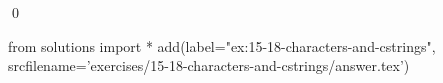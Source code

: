 
\begin{ex}
  \label{ex:15-18-characters-and-cstrings}
  
  \qed
\end{ex}
\begin{python0}
from solutions import *
add(label="ex:15-18-characters-and-cstrings",
    srcfilename='exercises/15-18-characters-and-cstrings/answer.tex')
\end{python0}
